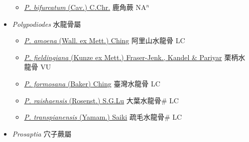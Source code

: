 \begin{itemize}
  \begin{itemize}
        \item[] \href{http://www.theplantlist.org/tpl1.1/search?q=Platycerium+bifurcatum}{\textit{P. bifurcatum} (Cav.) C.Chr.}   鹿角蕨 NA$^n$
  \end{itemize}
 \item[] \textit{Polypodiodes} 水龍骨屬
                    
  \begin{itemize}
        \item[] \href{http://www.theplantlist.org/tpl1.1/search?q=Polypodiodes+amoena}{\textit{P. amoena} (Wall. ex Mett.) Ching}     阿里山水龍骨 LC
        \item[] \href{http://www.theplantlist.org/tpl1.1/search?q=Polypodiodes+fieldingiana}{\textit{P. fieldingiana} (Kunze ex Mett.) Fraser-Jenk., Kandel \& Pariyar}     栗柄水龍骨 VU
        \item[] \href{http://www.theplantlist.org/tpl1.1/search?q=Polypodiodes+formosana}{\textit{P. formosana} (Baker) Ching}     臺灣水龍骨 LC
        \item[] \href{http://www.theplantlist.org/tpl1.1/search?q=Polypodiodes+raishaensis}{\textit{P. raishaensis} (Rosenst.) S.G.Lu}     大葉水龍骨\# LC
        \item[] \href{http://www.theplantlist.org/tpl1.1/search?q=Polypodiodes+transpianensis}{\textit{P. transpianensis} (Yamam.) Saiki}     疏毛水龍骨\# LC
  \end{itemize}
 \item[] \textit{Prosaptia} 穴子蕨屬
                    

\end{itemize}

